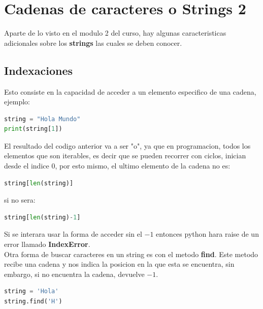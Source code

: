 \documentclass{article}
\begin{document}
\section{Cadenas de caracteres o Strings 2}
Aparte de lo visto en el modulo 2 del curso, hay algunas caracteristicas adicionales sobre los \textbf{strings} las cuales se deben conocer.
\subsection{Indexaciones}
Esto consiste en la capacidad de acceder a un elemento especifico de una cadena, ejemplo: 
\begin{lstlisting}[language=Python, caption=Indexacion String]
string = "Hola Mundo"
print(string[1])
\end{lstlisting}
El resultado del codigo anterior va a ser "o", ya que en programacion, todos los elementos que son iterables, es decir que se pueden recorrer con ciclos, inician desde el indice 0, por esto mismo, el ultimo elemento de la cadena no es: 
\begin{lstlisting}[language=Python, caption=Indexacion String 2 ]
string[len(string)]
\end{lstlisting}
si no sera:
\begin{lstlisting}[language=Python, caption=Indexacion String 3 ]
string[len(string)-1]
\end{lstlisting}
Si se interara usar la forma de acceder sin el \(-1\) entonces python hara raise de un error llamado \textbf{IndexError}.\\
Otra forma de buscar caracteres en un string es con el metodo \textbf{find}. Este metodo recibe una cadena y nos indica la posicion en la que esta se encuentra, sin embargo, si no encuentra la cadena, devuelve \(-1\).
\begin{lstlisting}[language=Python, caption=Metodo Find]
string = 'Hola'
string.find('H')
\end{lstlisting}
\end{document}
